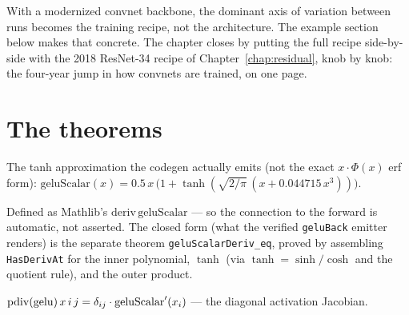 With a modernized convnet backbone, the dominant axis of
variation between runs becomes the training recipe, not
the architecture. The example section below makes that
concrete. The chapter
closes by putting the full recipe side-by-side with the 2018
ResNet-34 recipe of
Chapter~\ref{chap:residual}, knob by knob: the four-year jump in
how convnets are trained, on one page.

\section{The theorems}



\begin{definition}
  \label{ax:geluScalar}
  \leanok
  The tanh approximation the codegen actually emits (not the exact
  \(x \cdot \Phi(x)\) erf form):
  \(\mathrm{geluScalar}(x) = 0.5\, x\, \bigl(1 + \tanh(\sqrt{2/\pi}\,
  (x + 0.044715\, x^3))\bigr)\).
\end{definition}

\begin{definition}
  \label{ax:geluScalarDeriv}
  \leanok
  Defined as Mathlib's \(\mathrm{deriv}\, \mathrm{geluScalar}\) --- so
  the connection to the forward is automatic, not asserted. The
  closed form (what the verified \texttt{geluBack} emitter renders) is
  the separate theorem \texttt{geluScalarDeriv\_eq}, proved by
  assembling \texttt{HasDerivAt} for the inner polynomial, \(\tanh\)
  (via \(\tanh = \sinh/\cosh\) and the quotient rule), and the outer
  product.
\end{definition}

\begin{theorem}
  \label{ax:pdiv_gelu}
  \leanok
  \Prove{} \(\operatorname{pdiv}(\mathrm{gelu})\, x\, i\, j
    = \delta_{ij} \cdot \mathrm{geluScalar}'(x_i)\) --- the diagonal
  activation Jacobian.
\end{theorem}

